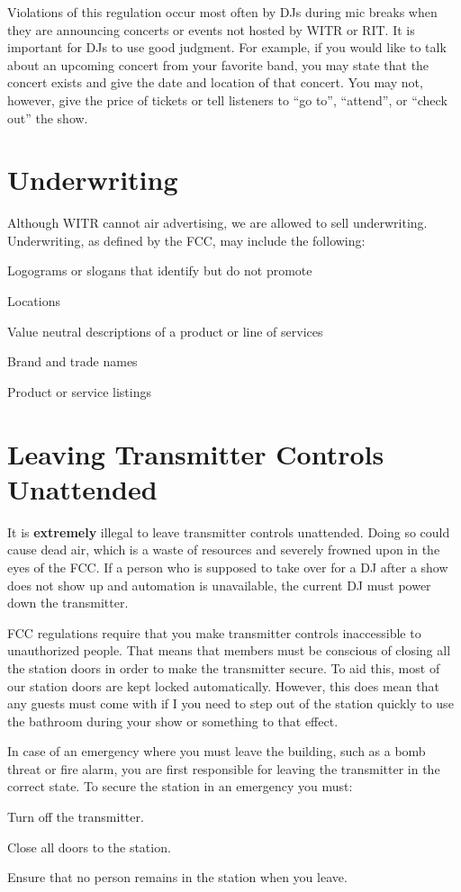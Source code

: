 \documentclass{witrman}
\begin{document}
Violations of this regulation occur most often by DJs during mic breaks when
they are announcing concerts or events not hosted by WITR or RIT\@. It is
important for DJs to use good judgment. For example, if you would like to talk
about an upcoming concert from your favorite band, you may state that the
concert exists and give the date and location of that concert. You may not,
however, give the price of tickets or tell listeners to ``go to'', ``attend'',
or ``check out'' the show.

\section{Underwriting}
Although WITR cannot air advertising, we are allowed to sell underwriting.
Underwriting, as defined by the FCC, may include the following:
\begin{tightitemize}
    \item Logograms or slogans that identify but do not promote
    \item Locations
    \item Value neutral descriptions of a product or line of services
    \item Brand and trade names
    \item Product or service listings
\end{tightitemize}

\section{Leaving Transmitter Controls Unattended}
It is \textbf{extremely} illegal to leave transmitter controls unattended. Doing
so could cause dead air, which is a waste of resources and severely frowned upon
in the eyes of the FCC\@. If a person who is supposed to take over for a DJ after
a show does not show up and automation is unavailable, the current DJ must power
down the transmitter.

FCC regulations require that you make transmitter controls inaccessible to
unauthorized people. That means that members must be conscious of closing all
the station doors in order to make the transmitter secure. To aid this, most of
our station doors are kept locked automatically. However, this does mean that
any guests must come with if I you need to step out of the station quickly to
use the bathroom during your show or something to that effect.

In case of an emergency where you must leave the building, such as a bomb threat
or fire alarm, you are first responsible for leaving the transmitter in the
correct state. To secure the station in an emergency you must:
\begin{tightenumerate}
    \item Turn off the transmitter.
    \item Close all doors to the station.
    \item Ensure that no person remains in the station when you leave.
\end{tightenumerate}
\end{document}
